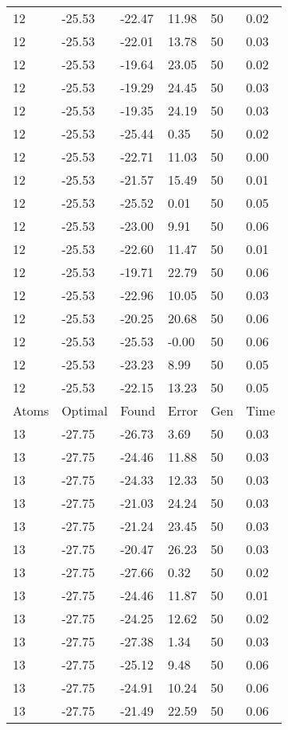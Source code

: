 \documentclass{report}
\begin{document}
\begin{appendix}
\begin{longtable}{llllll}
12 & -25.53 & -22.47 & 11.98 & 50 & 0.02 \\
12 & -25.53 & -22.01 & 13.78 & 50 & 0.03 \\
12 & -25.53 & -19.64 & 23.05 & 50 & 0.02 \\
12 & -25.53 & -19.29 & 24.45 & 50 & 0.03 \\
12 & -25.53 & -19.35 & 24.19 & 50 & 0.03 \\
12 & -25.53 & -25.44 & 0.35 & 50 & 0.02 \\
12 & -25.53 & -22.71 & 11.03 & 50 & 0.00 \\
12 & -25.53 & -21.57 & 15.49 & 50 & 0.01 \\
12 & -25.53 & -25.52 & 0.01 & 50 & 0.05 \\
12 & -25.53 & -23.00 & 9.91 & 50 & 0.06 \\
12 & -25.53 & -22.60 & 11.47 & 50 & 0.01 \\
12 & -25.53 & -19.71 & 22.79 & 50 & 0.06 \\
12 & -25.53 & -22.96 & 10.05 & 50 & 0.03 \\
12 & -25.53 & -20.25 & 20.68 & 50 & 0.06 \\
12 & -25.53 & -25.53 & -0.00 & 50 & 0.06 \\
12 & -25.53 & -23.23 & 8.99 & 50 & 0.05 \\
12 & -25.53 & -22.15 & 13.23 & 50 & 0.05 \\
Atoms & Optimal & Found & Error & Gen & Time \\
13 & -27.75 & -26.73 & 3.69 & 50 & 0.03 \\
13 & -27.75 & -24.46 & 11.88 & 50 & 0.03 \\
13 & -27.75 & -24.33 & 12.33 & 50 & 0.03 \\
13 & -27.75 & -21.03 & 24.24 & 50 & 0.03 \\
13 & -27.75 & -21.24 & 23.45 & 50 & 0.03 \\
13 & -27.75 & -20.47 & 26.23 & 50 & 0.03 \\
13 & -27.75 & -27.66 & 0.32 & 50 & 0.02 \\
13 & -27.75 & -24.46 & 11.87 & 50 & 0.01 \\
13 & -27.75 & -24.25 & 12.62 & 50 & 0.02 \\
13 & -27.75 & -27.38 & 1.34 & 50 & 0.03 \\
13 & -27.75 & -25.12 & 9.48 & 50 & 0.06 \\
13 & -27.75 & -24.91 & 10.24 & 50 & 0.06 \\
13 & -27.75 & -21.49 & 22.59 & 50 & 0.06 \\

\end{longtable}
\end{appendix}
\end{document}
